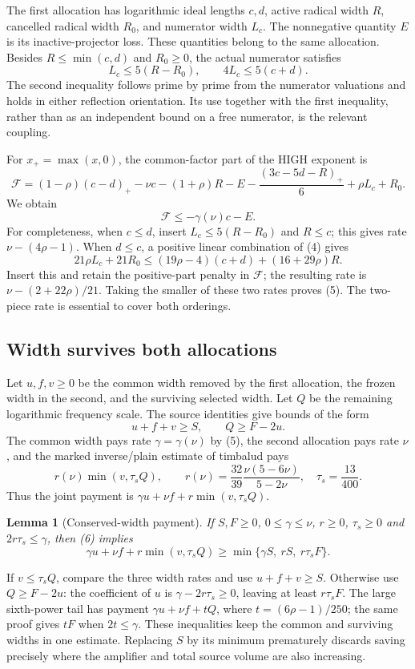 \documentclass[10pt,a4paper]{article}
\newtheorem{lemma}{Lemma}
\begin{document}
The first allocation has logarithmic ideal lengths $c,d$, active radical
width $R$, cancelled radical width $R_0$, and numerator width $L_c$.
The nonnegative quantity $E$ is its inactive-projector loss. These quantities
belong to the same allocation. Besides $R\le\min(c,d)$ and $R_0\ge0$,
the actual numerator satisfies
\[
 L_c\le5(R-R_0),\qquad 4L_c\le5(c+d).                    \tag{4}
\]
The second inequality follows prime by prime from the numerator valuations
and holds in either reflection orientation. Its use together with the
first inequality, rather than as an independent bound on a free numerator,
is the relevant coupling.

For $x_+=\max(x,0)$, the common-factor part of the HIGH exponent is
\[
 \mathcal F=(1-\rho)(c-d)_+-\nu c-(1+\rho)R-E
             -\frac{(3c-5d-R)_+}{6}+\rho L_c+R_0.
\]
We obtain
\[
                   \mathcal F\le-\gamma(\nu)c-E.         \tag{5}
\]
For completeness, when $c\le d$, insert $L_c\le5(R-R_0)$ and $R\le c$;
this gives rate $\nu-(4\rho-1)$. When $d\le c$, a positive linear
combination of (4) gives
\[
 21\rho L_c+21R_0\le(19\rho-4)(c+d)+(16+29\rho)R.
\]
Insert this and retain the positive-part penalty in $\mathcal F$; the
resulting rate is $\nu-(2+22\rho)/21$. Taking the smaller of these two
rates proves (5). The two-piece rate is essential to cover both orderings.

\subsection*{Width survives both allocations}
Let $u,f,v\ge0$ be the common width removed by the first allocation,
the frozen width in the second, and the surviving selected width.
Let $Q$ be the remaining logarithmic frequency scale. The source identities
give bounds of the form
\[
                 u+f+v\ge S,\qquad Q\ge F-2u.            \tag{6}
\]
The common width pays rate $\gamma=\gamma(\nu)$ by (5), the second allocation
pays rate $\nu$, and the marked inverse/plain estimate of timbalud
\cite{asymmetric} pays
\[
 r(\nu)\min(v,\tau_sQ),\qquad
 r(\nu)=\frac{32}{39}\frac{\nu(5-6\nu)}{5-2\nu},\quad
 \tau_s=\frac{13}{400}.
\]
Thus the joint payment is $\gamma u+\nu f+r\min(v,\tau_sQ)$.

\begin{lemma}[Conserved-width payment]
If $S,F\ge0$, $0\le\gamma\le\nu$, $r\ge0$, $\tau_s\ge0$ and
$2r\tau_s\le\gamma$, then (6) implies
\[
 \gamma u+\nu f+r\min(v,\tau_sQ)
       \ge\min\{\gamma S,\ rS,\ r\tau_sF\}.             \tag{7}
\]
\end{lemma}
If $v\le\tau_sQ$, compare the three width rates and use $u+f+v\ge S$.
Otherwise use $Q\ge F-2u$: the coefficient of $u$ is
$\gamma-2r\tau_s\ge0$, leaving at least $r\tau_sF$.
The large sixth-power tail has payment $\gamma u+\nu f+tQ$,
where $t=(6\rho-1)/250$; the same proof gives $tF$ when $2t\le\gamma$.
These inequalities keep the common and surviving widths in one estimate.
Replacing $S$ by its minimum prematurely discards saving precisely where
the amplifier and total source volume are also increasing.
\end{document}
